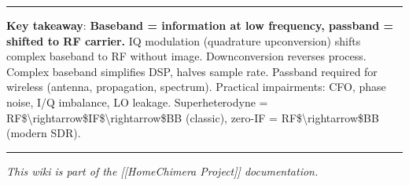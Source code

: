 \begin{center}\rule{0.5\linewidth}{0.5pt}\end{center}

\textbf{Key takeaway}: \textbf{Baseband = information at low frequency,
passband = shifted to RF carrier.} IQ modulation (quadrature
upconversion) shifts complex baseband to RF without image.
Downconversion reverses process. Complex baseband simplifies DSP, halves
sample rate. Passband required for wireless (antenna, propagation,
spectrum). Practical impairments: CFO, phase noise, I/Q imbalance, LO
leakage. Superheterodyne =
RF\$\textbackslash rightarrow\$IF\$\textbackslash rightarrow\$BB
(classic), zero-IF = RF\$\textbackslash rightarrow\$BB (modern SDR).

\begin{center}\rule{0.5\linewidth}{0.5pt}\end{center}

\emph{This wiki is part of the {[}{[}Home\textbar Chimera Project{]}{]}
documentation.}
